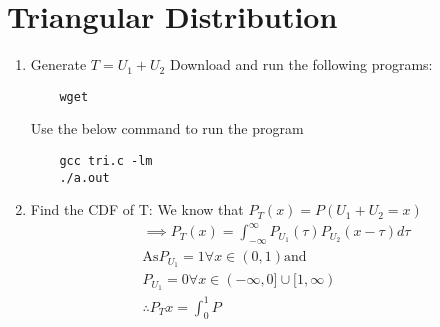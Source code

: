 \documentclass[journal,12pt,twocolumn]{IEEEtran}
\renewcommand\thesection{\arabic{section}}
\begin{document}
\section{Triangular Distribution}
\begin{enumerate}[label=\thesection.\arabic*
,ref=\thesection.\theenumi]

\item Generate $T=U_1+U_2$
\solution Download and run the following programs:
\begin{lstlisting}
    wget
\end{lstlisting}
Use the below command to run the program
\begin{lstlisting}
    gcc tri.c -lm
    ./a.out
\end{lstlisting}
\item Find the CDF of T:
\solution We know that $P_T(x)=P(U_1+U_2=x)$
\begin{align}
    &\implies P_T(x)=\int_{-\infty}^{\infty}P_{U_1}(\tau)P_{U_2}(x-\tau)d\tau\\
    &\text{As} P_{U_1}=1 \forall x\in (0,1) \text{and}\\
    &P_{U_1}=0 \forall x\in (-\infty,0]\cup[1,\infty)\\
    &\therefore P_T{x}=\int_{0}^{1}P_{}
\end{align}
\end{enumerate}
\end{document}
